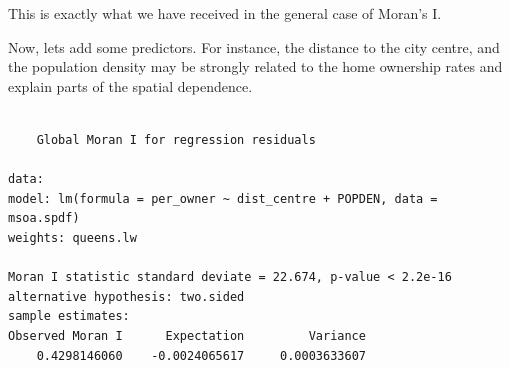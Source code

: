 \documentclass[
  letterpaper,
  DIV=11,
  numbers=noendperiod]{scrreprt}
\newenvironment{Shaded}{\begin{snugshade}}{\end{snugshade}}
\newcommand{\AttributeTok}[1]{\textcolor[rgb]{0.40,0.45,0.13}{#1}}
\newcommand{\CommentTok}[1]{\textcolor[rgb]{0.37,0.37,0.37}{#1}}
\newcommand{\DecValTok}[1]{\textcolor[rgb]{0.68,0.00,0.00}{#1}}
\newcommand{\DocumentationTok}[1]{\textcolor[rgb]{0.37,0.37,0.37}{\textit{#1}}}
\newcommand{\FloatTok}[1]{\textcolor[rgb]{0.68,0.00,0.00}{#1}}
\newcommand{\FunctionTok}[1]{\textcolor[rgb]{0.28,0.35,0.67}{#1}}
\newcommand{\NormalTok}[1]{\textcolor[rgb]{0.00,0.23,0.31}{#1}}
\newcommand{\OtherTok}[1]{\textcolor[rgb]{0.00,0.23,0.31}{#1}}
\newcommand{\SpecialCharTok}[1]{\textcolor[rgb]{0.37,0.37,0.37}{#1}}
\newcommand{\StringTok}[1]{\textcolor[rgb]{0.13,0.47,0.30}{#1}}
\begin{document}
This is exactly what we have received in the general case of Moran's I.

Now, lets add some predictors. For instance, the distance to the city
centre, and the population density may be strongly related to the home
ownership rates and explain parts of the spatial dependence.

\begin{Shaded}
\end{Shaded}

\begin{verbatim}

    Global Moran I for regression residuals

data:  
model: lm(formula = per_owner ~ dist_centre + POPDEN, data = msoa.spdf)
weights: queens.lw

Moran I statistic standard deviate = 22.674, p-value < 2.2e-16
alternative hypothesis: two.sided
sample estimates:
Observed Moran I      Expectation         Variance 
    0.4298146060    -0.0024065617     0.0003633607 
\end{verbatim}
\end{document}
